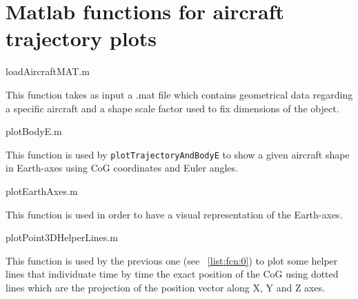 \documentclass[[12pt,twoside]{book}
\begin{document}
%
%
\chapter%
   [Matlab functions for aircraft trajectory plots]%
   {Matlab functions for aircraft trajectory plots}
\label{chap:Appendix:Matlab:Trajectory}

%
    {loadAircraftMAT.m}
    
    This function takes as input a .mat file which contains geometrical data regarding a specific aircraft and a shape scale factor used to fix dimensions of the object.
    
%
    {plotBodyE.m}
  
  This function is used by \lstinline[basicstyle=\ttfamily]{plotTrajectoryAndBodyE} to show a given aircraft shape in Earth-axes using CoG coordinates and Euler angles.  
  
    {plotEarthAxes.m}
  
  This function is used in order to have a visual representation of the Earth-axes.
  
%
    {plotPoint3DHelperLines.m}
    
    This function is used by the previous one (see \lstlistingname~\ref{list:fcn:0}) to plot some helper lines that individuate time by time the exact position of the CoG using dotted lines which are the projection of the position vector along X, Y and Z axes. 
  
\end{document}
